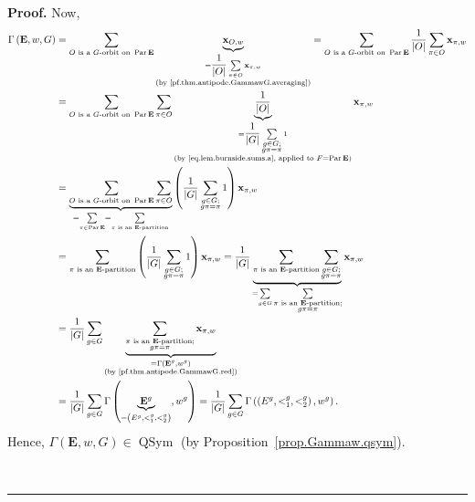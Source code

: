 \documentclass[numbers=enddot,12pt,final,onecolumn,notitlepage,abstracton]{scrartcl}%
\theoremstyle{definition}
\newenvironment{proof}[1][Proof]{\noindent\textbf{#1.} }{\ \rule{0.5em}{0.5em}}
\let\sumnonlimits\sum
\renewcommand{\sum}{\sumnonlimits\limits}
\newcommand{\xx}{{\mathbf{x}}}
\newcommand{\QSym}{{\operatorname{QSym}}}
\newcommand{\Par}{\operatorname{Par}}
\newcommand{\EE}{{\mathbf{E}}}
\begin{document}
\begin{proof}
Now,
\begin{align}
\Gamma\left( \EE , w, G\right)   &  =\sum_{O\text{ is a
}G\text{-orbit on } \Par \EE }\underbrace{\xx_{O,w}}_{
\substack{=\dfrac{1}{\left\vert O\right\vert }\sum\limits_{\pi\in
O}\xx_{\pi,w}\\\text{(by \eqref{pf.thm.antipode.GammawG.averaging})}%
}}=\sum_{O\text{ is a }G\text{-orbit on } \Par \EE }
\dfrac{1}{\left\vert O\right\vert }\sum\limits_{\pi\in O}\xx_{\pi
,w}\nonumber\\
&  =\sum_{O\text{ is a }G\text{-orbit on } \Par \EE
}\sum\limits_{\pi\in O}\underbrace{\dfrac{1}{\left\vert O\right\vert }%
}_{\substack{=\dfrac{1}{\left\vert G\right\vert }\sum_{\substack{g\in
G;\\g\pi=\pi}}1\\\text{(by \eqref{eq.lem.burnside.sums.a}, applied to }
F = \Par\EE {)}}}\xx_{\pi,w}
\nonumber\\
& = \underbrace{\sum_{O \text{ is a } G\text{-orbit on } \Par \EE}
\sum\limits_{\pi\in O}}_{=\sum_{\pi\in \Par \EE }
=\sum_{\pi\text{ is an } \EE \text{-partition}}}
\left(
\dfrac{1}{\left\vert G\right\vert }\sum_{\substack{g\in G;\\g\pi=\pi
}}1\right)  \xx_{\pi,w}\nonumber\\
&  =\sum_{\pi\text{ is an } \EE \text{-partition}}\left(  \dfrac
{1}{\left\vert G\right\vert }\sum_{\substack{g\in G;\\g\pi=\pi}}1\right)
\xx_{\pi,w}=\dfrac{1}{\left\vert G\right\vert }\underbrace{\sum
_{\pi\text{ is an } \EE \text{-partition}}\sum_{\substack{g\in
G;\\g\pi=\pi}}}_{=\sum_{g\in G}\sum_{\substack{\pi\text{ is an }\EE
\text{-partition;}\\g\pi=\pi}}}\xx_{\pi,w}\nonumber\\
&  =\dfrac{1}{\left\vert G\right\vert }\sum_{g\in G}\underbrace{\sum
_{\substack{\pi\text{ is an } \EE \text{-partition;}\\g\pi=\pi
}}\xx_{\pi,w}}_{\substack{=\Gamma\left(   \EE ^{g},w^{g}\right)
\\\text{(by \eqref{pf.thm.antipode.GammawG.red})}}}\nonumber\\
&  =\dfrac{1}{\left\vert G\right\vert }\sum_{g\in G}\Gamma\left(
\underbrace{ \EE ^{g}}_{=\left(  E^{g},<_{1}^{g},<_{2}^{g}\right)
},w^{g}\right)  =\dfrac{1}{\left\vert G\right\vert }\sum_{g\in G}\Gamma\left(
\left(  E^{g},<_{1}^{g},<_{2}^{g}\right)  ,w^{g}\right)
.
\label{pf.thm.antipode.GammawG.1}
\end{align}
Hence, $\Gamma\left(  { \EE },w,G\right) \in \QSym$
(by Proposition~\ref{prop.Gammaw.qsym}).



\end{proof}
\end{document}
